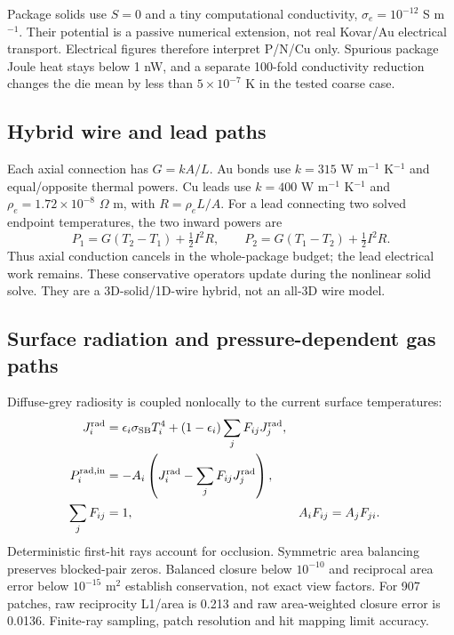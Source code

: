 \documentclass[11pt,a4paper]{article}
\begin{document}
Package solids use $S=0$ and a tiny computational conductivity,
$\sigma_e=10^{-12}$ S m$^{-1}$. Their potential is a passive numerical extension,
not real Kovar/Au electrical transport. Electrical figures therefore interpret
P/N/Cu only. Spurious package Joule heat stays below 1 nW, and a separate
100-fold conductivity reduction changes the die mean by less than
$5\times10^{-7}$ K in the tested coarse case.

\subsection{Hybrid wire and lead paths}
Each axial connection has $G=kA/L$. Au bonds use $k=315$ W m$^{-1}$ K$^{-1}$
and equal/opposite thermal powers. Cu leads use $k=400$ W m$^{-1}$ K$^{-1}$ and
$\rho_e=1.72\times10^{-8}$ $\Omega$ m, with $R=\rho_e L/A$.
For a lead connecting two solved endpoint temperatures, the two inward powers are
\begin{equation}
P_1=G(T_2-T_1)+\tfrac12 I^2R,\qquad
P_2=G(T_1-T_2)+\tfrac12 I^2R.
\end{equation}
Thus axial conduction cancels in the whole-package budget; the lead electrical
work remains. These conservative operators update during the nonlinear solid
solve. They are a 3D-solid/1D-wire hybrid, not an all-3D wire model.
\clearpage
\subsection{Surface radiation and pressure-dependent gas paths}
Diffuse-grey radiosity is coupled nonlocally to the current surface temperatures:
\begin{align}
J_i^{\rm rad}&=\epsilon_i\sigma_{\rm SB}T_i^4+
 (1-\epsilon_i)\sum_jF_{ij}J_j^{\rm rad},\\
P_i^{\rm rad,in}&=-A_i\left(J_i^{\rm rad}-\sum_jF_{ij}J_j^{\rm rad}\right),\\
\sum_jF_{ij}&=1,& A_iF_{ij}&=A_jF_{ji}.
\end{align}
Deterministic first-hit rays account for occlusion. Symmetric area balancing
preserves blocked-pair zeros. Balanced closure below $10^{-10}$ and reciprocal
area error below $10^{-15}$ m$^2$ establish conservation, not exact view factors.
For 907 patches, raw reciprocity L1/area is 0.213 and raw area-weighted closure
error is 0.0136. Finite-ray sampling, patch resolution and hit mapping limit accuracy.
\end{document}
